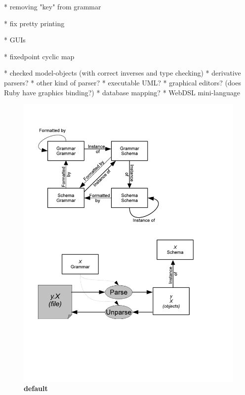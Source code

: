 \documentclass[11pt]{article}
\begin{document}
* removing "key" from grammar

* fix pretty printing 

* GUIs

* fixedpoint cyclic map





* checked model-objects (with correct inverses and type checking)
* derivative parsers?
* other kind of parser?
* executable UML?
* graphical editors?
    (does Ruby have graphics binding?)
* database mapping?
* WebDSL mini-language




\begin{figure}[htbp]
\begin{center}
\includegraphics[scale=0.8]{QuadModel.pdf}
\caption{{\bf default}}
\label{default}
\end{center}
\end{figure}
\end{document}
